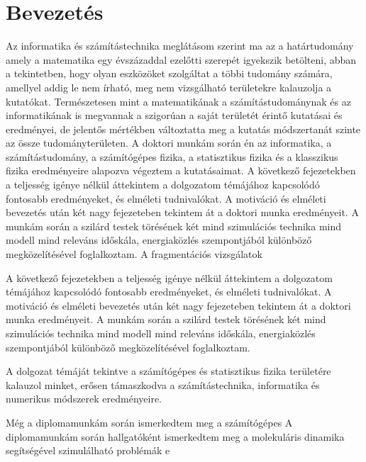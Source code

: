 \chapter*{Bevezetés}
\label{chapt:introduction}

Az informatika és számítástechnika meglátásom szerint ma az a határtudomány amely a matematika egy évszázaddal ezelőtti szerepét igyekszik betölteni, abban a tekintetben, hogy olyan eszközöket szolgáltat a többi tudomány számára, amellyel addig le nem írható, meg nem vizsgálható területekre kalauzolja a kutatókat. 
Természetesen mint a matematikának a számítástudománynak és az informatikának is megvannak a szigorúan a saját területét érintő kutatásai és eredményei, de jelentős mértékben változtatta meg a kutatás módszertanát szinte az össze tudományterületen. %
A doktori munkám során én az informatika, a számítástudomány, a számítógépes fizika, a statisztikus fizika és a klasszikus fizika eredményeire alapozva végeztem a kutatásaimat.
A következő fejezetekben a teljesség igénye nélkül áttekintem a dolgozatom témájához kapcsolódó fontosabb eredményeket, és elméleti tudnivalókat. A motiváció és elméleti bevezetés után két nagy fejezeteben tekintem át a doktori munka eredményeit. A munkám során a szilárd testek törésének két mind szimulációs technika mind modell mind releváns időskála, energiaközlés szempontjából különböző megközelítésével foglalkoztam.
A fragmentációs vizsgálatok 


A következő fejezetekben a teljesség igénye nélkül áttekintem a dolgozatom témájához kapcsolódó fontosabb eredményeket, és elméleti tudnivalókat. A motiváció és elméleti bevezetés után két nagy fejezeteben tekintem át a doktori munka eredményeit. A munkám során a szilárd testek törésének két mind szimulációs technika mind modell mind releváns időskála, energiaközlés szempontjából különböző megközelítésével foglalkoztam.


%

A dolgozat témáját tekintve a számítógépes és statisztikus fizika területére kalauzol minket, erősen támaszkodva a számítástechnika, informatika és numerikus módszerek eredményeire.

Még a diplomamunkám során ismerkedtem meg a számítógépes
A diplomamunkám során hallgatóként ismerkedtem meg a molekuláris dinamika segítségével szimulálható problémák e


